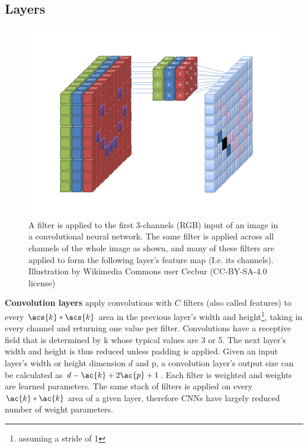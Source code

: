 \subsection{Layers}

\begin{figure}
  \begin{center}
    \includegraphics{gfx/Convolutional_Neural_Network_with_Color_Image_Filter.png}
    \caption[Standard convolution]{A filter is applied to the first 3-channels (RGB) input of an image in a convolutional neural network. The same filter is applied across all channels of the whole image as shown, and many of these filters are applied to form the following layer's feature map (I.e. its channels). Illustration by Wikimedia Commons user Cecbur (CC-BY-SA-4.0 license)}
    \label{fig:convolutionfilter}
  \end{center}
\end{figure}

\textbf{Convolution layers} apply convolutions with $C$ filters (also called features) to every $\acs{k}*\acs{k}$ area in the previous layer's width and height\footnote{assuming a stride of 1}, taking in every channel and returning one value per filter. Convolutions have a receptive field that is determined by \ac{k} whose typical values are 3 or 5. The next layer's width and height is thus reduced unless padding is applied. Given an input layer's width or height dimension $d$ and \ac{p}, a convolution layer's output size can be calculated as $d-\ac{k}+2\ac{p}+1$. Each filter is weighted and weights are learned parameters. The same stack of filters is applied on every $\ac{k}*\ac{k}$ area of a given layer, therefore \acp{CNN} have largely reduced number of weight parameters.


